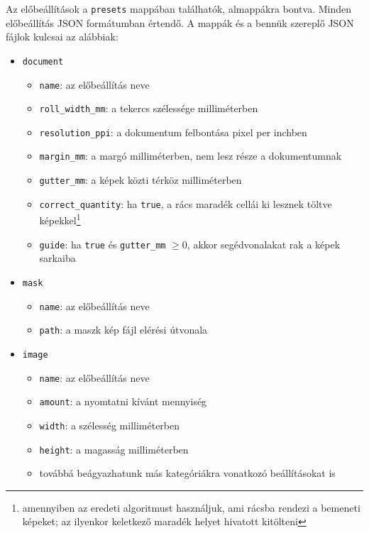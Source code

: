 Az előbeállítások a \texttt{presets} mappában találhatók, almappákra bontva. Minden előbeállítás JSON formátumban értendő. A mappák és a bennük szereplő JSON fájlok kulcsai az alábbiak:
\begin{itemize}
    \item \texttt{document}
    \begin{itemize}
        \item \texttt{name}: az előbeállítás neve
        \item \texttt{roll\_width\_mm}: a tekercs szélessége milliméterben
        \item \texttt{resolution\_ppi}: a dokumentum felbontása pixel per inchben
        \item \texttt{margin\_mm}: a margó milliméterben, nem lesz része a dokumentumnak
        \item \texttt{gutter\_mm}: a képek közti térköz milliméterben
        \item \texttt{correct\_quantity}: ha \texttt{true}, a rács maradék cellái ki lesznek töltve képekkel\footnote{amennyiben az eredeti algoritmust használjuk, ami rácsba rendezi a bemeneti képeket; az ilyenkor keletkező maradék helyet hivatott kitölteni}
        \item \texttt{guide}: ha \texttt{true} és \texttt{gutter\_mm} \begin{math}
            \geq 0
        \end{math}, akkor segédvonalakat rak a képek sarkaiba
    \end{itemize}

    \item \texttt{mask}
    \begin{itemize}
        \item \texttt{name}: az előbeállítás neve
        \item \texttt{path}: a maszk kép fájl elérési útvonala
    \end{itemize}

    \item \texttt{image}
    \begin{itemize}
        \item \texttt{name}: az előbeállítás neve
        \item \texttt{amount}: a nyomtatni kívánt mennyiség
        \item \texttt{width}: a szélesség milliméterben
        \item \texttt{height}: a magasság milliméterben
        \item továbbá beágyazhatunk más kategóriákra vonatkozó beállításokat is
    \end{itemize}
\end{itemize}